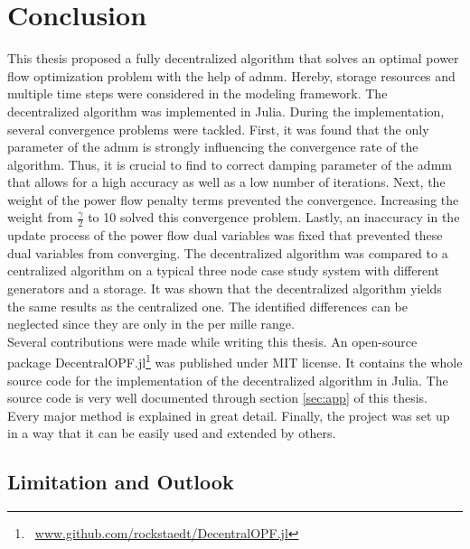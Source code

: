 \section{Conclusion}

This thesis proposed a fully decentralized algorithm that solves an optimal power flow optimization problem with the help of \gls{admm}. Hereby, storage resources and multiple time steps were considered in the modeling framework. The decentralized algorithm was implemented in Julia. During the implementation, several convergence problems were tackled. First, it was found that the only parameter of the \gls{admm} is strongly influencing the convergence rate of the algorithm. Thus, it is crucial to find to correct damping parameter of the \gls{admm} that allows for a high accuracy as well as a low number of iterations. Next, the weight of the power flow penalty terms prevented the convergence. Increasing the weight from $\frac{\gamma}{2}$ to 10 solved this convergence problem. Lastly, an inaccuracy in the update process of the power flow dual variables was fixed that prevented these dual variables from converging. The decentralized algorithm was compared to a centralized algorithm on a typical three node case study system with different generators and a storage. It was shown that the decentralized algorithm yields the same results as the centralized one. The identified differences can be neglected since they are only in the per mille range. \\

Several contributions were made while writing this thesis. An open-source package DecentralOPF.jl\footnote{~\url{www.github.com/rockstaedt/DecentralOPF.jl}} was published under MIT license. It contains the whole source code for the implementation of the decentralized algorithm in Julia. The source code is very well documented through section \ref{sec:app} of this thesis. Every major method is explained in great detail. Finally, the project was set up in a way that it can be easily used and extended by others. \\

\subsection{Limitation and Outlook}

